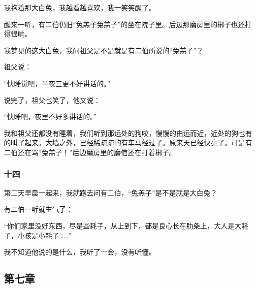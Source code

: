 \par 我抱着那大白兔，我越看越喜欢，我一笑笑醒了。
\par 醒来一听，有二伯仍旧“兔羔子兔羔子”的坐在院子里。后边那磨房里的梆子也还打得很响。
\par 我梦见的这大白兔，我问祖父是不是就是有二伯所说的“兔羔子”？
\par 祖父说：
\par “快睡觉吧，半夜三更不好讲话的。”
\par 说完了，祖父也笑了，他又说：
\par “快睡吧，夜里不好多讲话的。”
\par 我和祖父还都没有睡着，我们听到那远处的狗咬，慢慢的由远而近，近处的狗也有的叫了起来。大墙之外，已经稀疏疏的有车马经过了。原来天已经快亮了。可是有二伯还在骂“兔羔子！”后边磨房里的磨倌还在打着梆子。
\subsubsection*{十四}
\par 第二天早晨一起来，我就跑去问有二伯，“兔羔子”是不是就是大白兔？
\par 有二伯一听就生气了：
\par “你们家里没好东西，尽是些耗子，从上到下，都是良心长在肋条上，大人是大耗子，小孩是小耗子……”
\par 我不知道他说的是什么，我听了一会，没有听懂。


\subsection{第七章}

